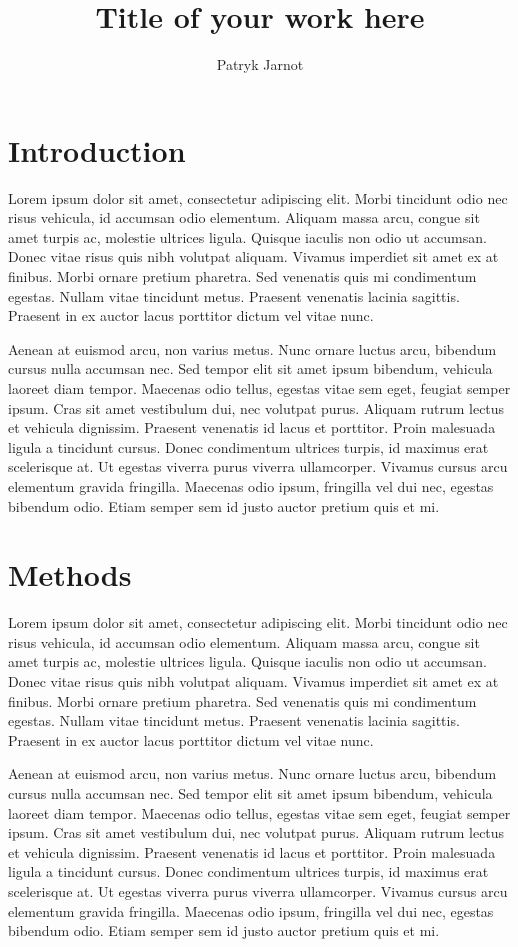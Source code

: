 \documentclass[twocolumn]{miniclass}
\title{Title of your work here}
\author[1,$\ast$]{Patryk Jarnot}
\affil[1]{Department of Computer Network and Systems, Silesian University of Technology}
\affil[$\ast$]{patryk.jarnot@polsl.pl}
\date{}
\begin{document}
\maketitle


\section{Introduction}
Lorem ipsum dolor sit amet, consectetur adipiscing elit. Morbi tincidunt odio nec risus vehicula, id accumsan odio elementum. Aliquam massa arcu, congue sit amet turpis ac, molestie ultrices ligula. Quisque iaculis non odio ut accumsan. Donec vitae risus quis nibh volutpat aliquam. Vivamus imperdiet sit amet ex at finibus. Morbi ornare pretium pharetra. Sed venenatis quis mi condimentum egestas. Nullam vitae tincidunt metus. Praesent venenatis lacinia sagittis. Praesent in ex auctor lacus porttitor dictum vel vitae nunc.

Aenean at euismod arcu, non varius metus. Nunc ornare luctus arcu, bibendum cursus nulla accumsan nec. Sed tempor elit sit amet ipsum bibendum, vehicula laoreet diam tempor. Maecenas odio tellus, egestas vitae sem eget, feugiat semper ipsum. Cras sit amet vestibulum dui, nec volutpat purus. Aliquam rutrum lectus et vehicula dignissim. Praesent venenatis id lacus et porttitor. Proin malesuada ligula a tincidunt cursus. Donec condimentum ultrices turpis, id maximus erat scelerisque at. Ut egestas viverra purus viverra ullamcorper. Vivamus cursus arcu elementum gravida fringilla. Maecenas odio ipsum, fringilla vel dui nec, egestas bibendum odio. Etiam semper sem id justo auctor pretium quis et mi.

\section{Methods}
Lorem ipsum dolor sit amet, consectetur adipiscing elit. Morbi tincidunt odio nec risus vehicula, id accumsan odio elementum. Aliquam massa arcu, congue sit amet turpis ac, molestie ultrices ligula. Quisque iaculis non odio ut accumsan. Donec vitae risus quis nibh volutpat aliquam. Vivamus imperdiet sit amet ex at finibus. Morbi ornare pretium pharetra. Sed venenatis quis mi condimentum egestas. Nullam vitae tincidunt metus. Praesent venenatis lacinia sagittis. Praesent in ex auctor lacus porttitor dictum vel vitae nunc.

Aenean at euismod arcu, non varius metus. Nunc ornare luctus arcu, bibendum cursus nulla accumsan nec. Sed tempor elit sit amet ipsum bibendum, vehicula laoreet diam tempor. Maecenas odio tellus, egestas vitae sem eget, feugiat semper ipsum. Cras sit amet vestibulum dui, nec volutpat purus. Aliquam rutrum lectus et vehicula dignissim. Praesent venenatis id lacus et porttitor. Proin malesuada ligula a tincidunt cursus. Donec condimentum ultrices turpis, id maximus erat scelerisque at. Ut egestas viverra purus viverra ullamcorper. Vivamus cursus arcu elementum gravida fringilla. Maecenas odio ipsum, fringilla vel dui nec, egestas bibendum odio. Etiam semper sem id justo auctor pretium quis et mi.
\end{document}

